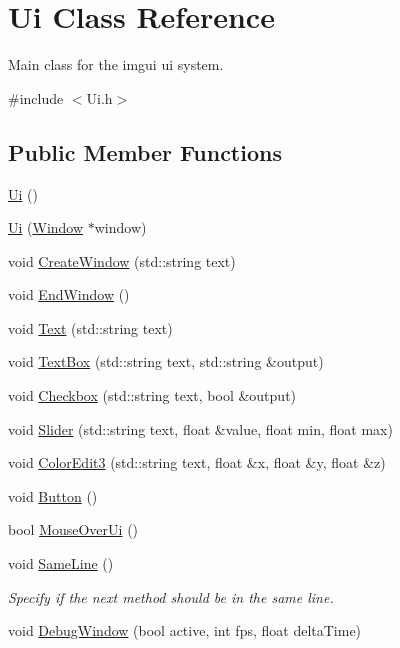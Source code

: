 \hypertarget{class_ui}{}\section{Ui Class Reference}
\label{class_ui}


Main class for the imgui ui system.  




{\ttfamily \#include $<$Ui.\+h$>$}

\subsection*{Public Member Functions}
\begin{DoxyCompactItemize}
\item 
\mbox{\hyperlink{class_ui_a6e07807d24fb5874a7e51d7ff0196236}{Ui}} ()
\item 
\mbox{\hyperlink{class_ui_a1f38d058c05e95d93d56a0018b246f5a}{Ui}} (\mbox{\hyperlink{class_window}{Window}} $\ast$window)
\item 
void \mbox{\hyperlink{class_ui_a8f820b28843d4c807f47220c38fb38b5}{Create\+Window}} (std\+::string text)
\item 
void \mbox{\hyperlink{class_ui_a1aafb018f23527ff83dfd98d0995e455}{End\+Window}} ()
\item 
void \mbox{\hyperlink{class_ui_a26dbd672340f84bd246c5c3a609f2402}{Text}} (std\+::string text)
\item 
void \mbox{\hyperlink{class_ui_a6ddbf246b6af53e4de87b93a449ff7fd}{Text\+Box}} (std\+::string text, std\+::string \&output)
\item 
void \mbox{\hyperlink{class_ui_a85329ee10838fa063307047658ad8506}{Checkbox}} (std\+::string text, bool \&output)
\item 
void \mbox{\hyperlink{class_ui_abf56602cba9e3287e1c5ca578fe30322}{Slider}} (std\+::string text, float \&value, float min, float max)
\item 
void \mbox{\hyperlink{class_ui_ae8c21b1e6c6583f4e2d73e800936a1cd}{Color\+Edit3}} (std\+::string text, float \&x, float \&y, float \&z)
\item 
void \mbox{\hyperlink{class_ui_a8c3bedaa0b52c63529cbbb460f322894}{Button}} ()
\item 
bool \mbox{\hyperlink{class_ui_a6c16c0e0266018102c3196fb0800647b}{Mouse\+Over\+Ui}} ()
\item 
\mbox{\label{class_ui_a02169a3a9e9731304a556cea88b7aaf5}} 
void \mbox{\hyperlink{class_ui_a02169a3a9e9731304a556cea88b7aaf5}{Same\+Line}} ()
\begin{DoxyCompactList}\small\item\em Specify if the next method should be in the same line. \end{DoxyCompactList}\item 
void \mbox{\hyperlink{class_ui_adbd30bcb9c19d95abfd2ecec6d2add65}{Debug\+Window}} (bool active, int fps, float delta\+Time)
\end{DoxyCompactItemize}


